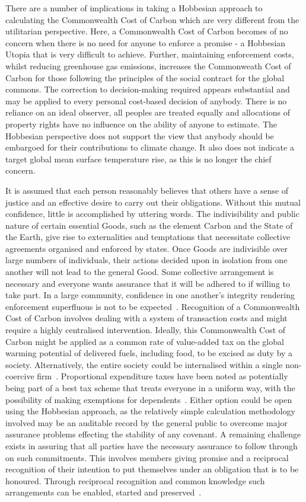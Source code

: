 \documentclass[11pt, oneside]{article}   	%
\begin{document}
There are a number of implications in taking a Hobbesian approach to calculating the Commonwealth Cost of Carbon which are very different from the utilitarian perspective.
Here, a Commonwealth Cost of Carbon becomes of no concern when there is no need for anyone to enforce a promise - a Hobbesian Utopia that is very difficult to achieve.
Further, maintaining enforcement costs, whilst reducing greenhouse gas emissions, increases the Commonweath Cost of Carbon for those following the principles of the social contract for the global commons.
The correction to decision-making required appears substantial and may be applied to every personal cost-based decision of anybody.
There is no reliance on an ideal observer, all peoples are treated equally and allocations of property rights have no influence on the ability of anyone to estimate.
The Hobbesian perspective does not support the view that anybody should be embargoed for their contributions to climate change.
It also does not indicate a target global mean surface temperature rise, as this is no longer the chief concern.\

It is assumed that each person reasonably believes that others have a sense of justice and an effective desire to carry out their obligations.
Without this mutual confidence, little is accomplished by uttering words.
The indivisibility and public nature of certain essential Goods, such as the element Carbon and the State of the Earth, give rise to externalities and temptations that necessitate collective agreements organised and enforced by states.
Once Goods are indivisible over large numbers of individuals, their actions decided upon in isolation from one another will not lead to the general Good.
Some collective arrangement is necessary and everyone wants assurance that it will be adhered to if willing to take part. In a large community, confidence in one another's integrity rendering enforcement superfluous is not to be expected~\cite{jr1}.
Recognition of a Commonwealth Cost of Carbon involves dealing with a system of transaction costs and might require a highly centralised intervention.
Ideally, this Commonwealth Cost of Carbon might be applied as a common rate of value-added tax on the global warming potential of delivered fuels, including food, to be excised as duty by a society.
Alternatively, the entire society could be internalised within a single non-coercive firm~\cite{rc1}.
Proportional expenditure taxes have been noted as potentially being part of a best tax scheme that treats everyone in a uniform way, with the possibility of making exemptions for dependents~\cite{nk1}.
Either option could be open using the Hobbesian approach, as the relatively simple calculation methodology involved may be an auditable record by the general public to overcome major assurance problems effecting the stability of any covenant.
A remaining challenge exists in assuring that all parties have the necessary assurance to follow through on such commitments.
This involves members giving promise and a reciprocal recognition of their intention to put themselves under an obligation that is to be honoured.
Through reciprocal recognition and common knowledge such arrangements can be enabled, started and preserved~\cite{hp1}.\
\end{document}
